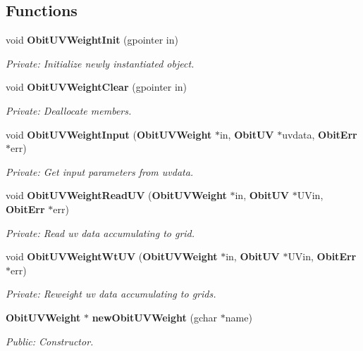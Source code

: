 \subsection*{Functions}
\begin{CompactItemize}
\item 
void {\bf Obit\-UVWeight\-Init} (gpointer in)
\begin{CompactList}\small\item\em Private: Initialize newly instantiated object. \item\end{CompactList}\item 
void {\bf Obit\-UVWeight\-Clear} (gpointer in)
\begin{CompactList}\small\item\em Private: Deallocate members. \item\end{CompactList}\item 
void {\bf Obit\-UVWeight\-Input} ({\bf Obit\-UVWeight} $\ast$in, {\bf Obit\-UV} $\ast$uvdata, {\bf Obit\-Err} $\ast$err)
\begin{CompactList}\small\item\em Private: Get input parameters from uvdata. \item\end{CompactList}\item 
void {\bf Obit\-UVWeight\-Read\-UV} ({\bf Obit\-UVWeight} $\ast$in, {\bf Obit\-UV} $\ast$UVin, {\bf Obit\-Err} $\ast$err)
\begin{CompactList}\small\item\em Private: Read uv data accumulating to grid. \item\end{CompactList}\item 
void {\bf Obit\-UVWeight\-Wt\-UV} ({\bf Obit\-UVWeight} $\ast$in, {\bf Obit\-UV} $\ast$UVin, {\bf Obit\-Err} $\ast$err)
\begin{CompactList}\small\item\em Private: Reweight uv data accumulating to grids. \item\end{CompactList}\item 
{\bf Obit\-UVWeight} $\ast$ {\bf new\-Obit\-UVWeight} (gchar $\ast$name)
\begin{CompactList}\small\item\em Public: Constructor. \item\end{CompactList}\item 

\end{CompactItemize}
